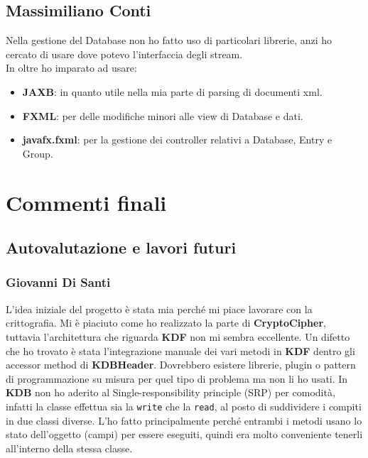 \documentclass[a4paper,12pt]{report}
\begin{document}
\section*{Massimiliano Conti}
Nella gestione del Database non ho fatto uso di particolari librerie, anzi ho cercato di usare dove potevo l'interfaccia degli stream.\\
In oltre ho imparato ad usare:
\begin{itemize}
    \item \textbf{JAXB}: in quanto utile nella mia parte di parsing di documenti xml.
    \item \textbf{FXML}: per delle modifiche minori alle view di Database e dati.
    \item \textbf{javafx.fxml}: per la gestione dei controller relativi a Database, Entry e Group.
\end{itemize}

\chapter{Commenti finali}

\section{Autovalutazione e lavori futuri}

\subsection*{Giovanni Di Santi}

L'idea iniziale del progetto è stata mia perché mi piace lavorare con la crittografia.
Mi è piaciuto come ho realizzato la parte di \textbf{CryptoCipher}, tuttavia l'architettura
che riguarda \textbf{KDF} non mi sembra eccellente. Un difetto che ho trovato
è stata l'integrazione manuale dei vari metodi in \textbf{KDF} dentro gli accessor
method di \textbf{KDBHeader}.  Dovrebbero esistere librerie, plugin o pattern di
programmazione su misura per quel tipo di problema ma non li ho usati.
In \textbf{KDB} non ho aderito al Single-responsibility principle (SRP) per comodità,
infatti la classe effettua sia la \texttt{write} che la \texttt{read}, al posto di suddividere
i compiti in due classi diverse. L'ho fatto principalmente perché entrambi i metodi
usano lo stato dell'oggetto (campi) per essere eseguiti, quindi era molto conveniente
tenerli all'interno della stessa classe.
\end{document}

